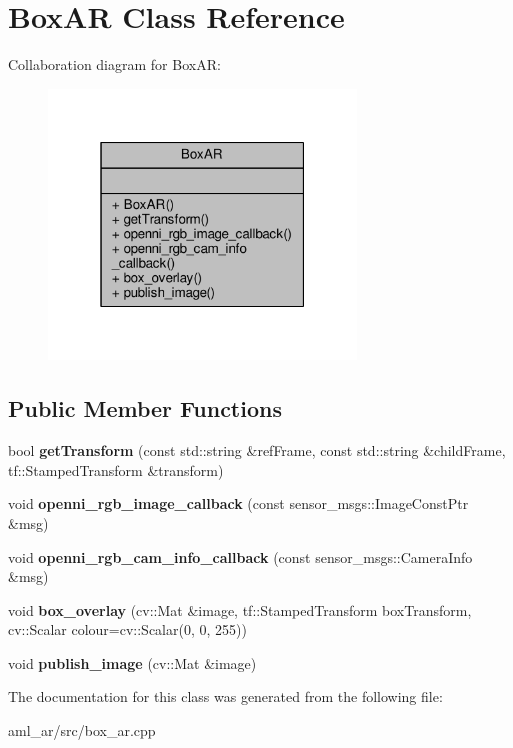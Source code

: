\hypertarget{class_box_a_r}{\section{Box\-A\-R Class Reference}
\label{class_box_a_r}
}


Collaboration diagram for Box\-A\-R\-:\nopagebreak
\begin{figure}[H]
\begin{center}
\leavevmode
\includegraphics[width=232pt]{class_box_a_r__coll__graph}
\end{center}
\end{figure}
\subsection*{Public Member Functions}
\begin{DoxyCompactItemize}
\item 
\hypertarget{class_box_a_r_a083a9842bff7362e1aaf1d553e490094}{bool {\bfseries get\-Transform} (const std\-::string \&ref\-Frame, const std\-::string \&child\-Frame, tf\-::\-Stamped\-Transform \&transform)}\label{class_box_a_r_a083a9842bff7362e1aaf1d553e490094}

\item 
\hypertarget{class_box_a_r_a366e98d7ec10627fd973228cc7c0c77d}{void {\bfseries openni\-\_\-rgb\-\_\-image\-\_\-callback} (const sensor\-\_\-msgs\-::\-Image\-Const\-Ptr \&msg)}\label{class_box_a_r_a366e98d7ec10627fd973228cc7c0c77d}

\item 
\hypertarget{class_box_a_r_a2f8307914c1f75d113e76cd4c80c4fe2}{void {\bfseries openni\-\_\-rgb\-\_\-cam\-\_\-info\-\_\-callback} (const sensor\-\_\-msgs\-::\-Camera\-Info \&msg)}\label{class_box_a_r_a2f8307914c1f75d113e76cd4c80c4fe2}

\item 
\hypertarget{class_box_a_r_a4b87723540c75deee10727981e1ea42b}{void {\bfseries box\-\_\-overlay} (cv\-::\-Mat \&image, tf\-::\-Stamped\-Transform box\-Transform, cv\-::\-Scalar colour=cv\-::\-Scalar(0, 0, 255))}\label{class_box_a_r_a4b87723540c75deee10727981e1ea42b}

\item 
\hypertarget{class_box_a_r_a38766d12db36b96f9fc40a9624129a30}{void {\bfseries publish\-\_\-image} (cv\-::\-Mat \&image)}\label{class_box_a_r_a38766d12db36b96f9fc40a9624129a30}

\end{DoxyCompactItemize}


The documentation for this class was generated from the following file\-:\begin{DoxyCompactItemize}
\item 
aml\-\_\-ar/src/box\-\_\-ar.\-cpp\end{DoxyCompactItemize}
